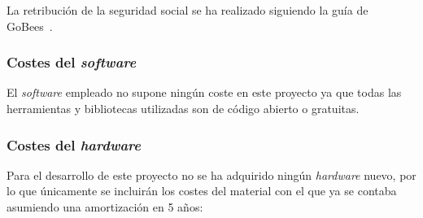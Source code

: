 La retribución de la seguridad social se ha realizado siguiendo la guía de GoBees~\cite{gobees}.

\subsubsection{Costes del \textit{software}}

El \textit{software} empleado no supone ningún coste en este proyecto ya que todas las herramientas y bibliotecas utilizadas son de código abierto o gratuitas. 

\subsubsection{Costes del \textit{hardware}}

Para el desarrollo de este proyecto no se ha adquirido ningún \textit{hardware} nuevo, por lo que únicamente se incluirán los costes del material con el que ya se contaba asumiendo una amortización en 5 años: 

